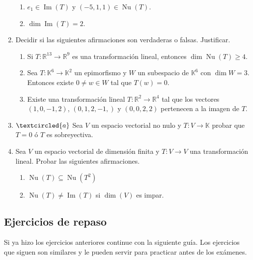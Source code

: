 \begin{enumerate}[topsep=6pt, itemsep=.4cm]
\begin{enumerate}[ topsep=5pt,itemsep=5pt]
        \item $e_1\in\operatorname{Im}(T)$ y $(-5,1,1)\in\operatorname{Nu}(T)$.
        
        \item $\operatorname{dim} \operatorname{Im}(T)=2$.
    \end{enumerate}
    

\item Decidir si las siguientes afirmaciones son verdaderas o falsas. Justificar.
\begin{enumerate}
\item  Si $T : \mathbb R^{13} \to \mathbb R^9$ es una transformación lineal, entonces $\dim \operatorname{Nu}(T) \geq  4$.
\item Sea $T:\mathbb{K}^{6}\longrightarrow\mathbb{K}^2$ un epimorfismo y $W$ un subespacio de $\mathbb{K}^{6}$ con $\dim W=3$. Entonces existe $0\neq w\in W$ tal que $T(w)=0$.
\item Existe una transformación lineal $T : \mathbb R^2 \to \mathbb R^4$ tal que los vectores $(1, 0, -1, 2)$, $(0, 1, 2,-1,)$ y $(0, 0, 2, 2)$ pertenecen a la imagen de $T$.

\end{enumerate}

\item \label{funcionales} $\textcircled{a}$ Sea $V$ un espacio vectorial no nulo y $T:V\longrightarrow\mathbb{K}$ probar que $T=0$ ó $T$ es sobreyectiva.

\item Sea $V$ un espacio vectorial de dimensión finita y $T:V\longrightarrow V$ una transformación lineal. Probar las siguientes afirmaciones.
    \begin{multicols}{2}
     \begin{enumerate}
    \item $\operatorname{Nu}(T)\subseteq\operatorname{Nu}(T^2)$
    \item\label{dimV impar} $\operatorname{Nu}(T)\neq\operatorname{Im}(T)$ si $\dim(V)$ es impar.
    \end{enumerate}
    \end{multicols}
      
\end{enumerate}


\subsection*{Ejercicios de repaso}
Si ya hizo los ejercicios anteriores continue con la siguiente guía. Los ejercicios que siguen son similares y le pueden servir para practicar antes de los exámenes.

